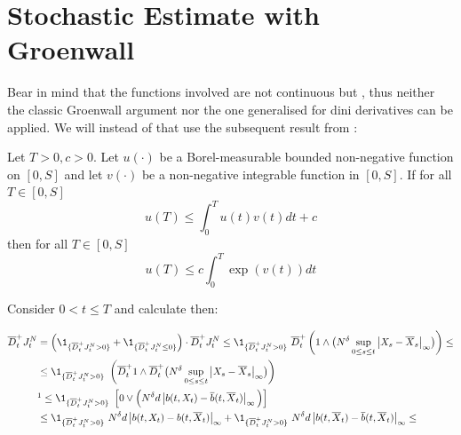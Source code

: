 \section{Stochastic Estimate with Groenwall}

Bear in mind that the functions involved are not continuous but \cadlag, thus neither the classic Groenwall argument nor the one generalised for dini derivatives \cite[Theorem 1.4.1]{groenwall-with-dini-derivatives} can be applied.
We will instead of that use the subsequent result from \cite[Chapter 1, Theorem 8.1]{groenwall-non-continuous-functions}:

\begin{lemma}	\label{ch6:lemma-groenwall-generalized}
	Let $T >0, c>0$. Let $u(\cdot)$ be a Borel-measurable bounded non-negative function on $[0,S]$ and let $v(\cdot)$ be a non-negative integrable function in $[0,S]$.
	If for all $T \in [0,S]$
		\begin{equation*}
			u(T) \leq \int_0^T u(t) v(t) dt + c
		\end{equation*}
	then for all $T \in [0,S]$
			\begin{equation*}
				u(T) \leq c\int_0^T \exp(v(t) )dt
			\end{equation*}
\end{lemma}

Consider $0 < t \leq T$ and calculate then:

\begin{align*}
	\diniu^+_t \auxProc_t^N 
	&= 
	\left( \1_{\{\diniu^+_t \auxProc_t^N >0 \}} + \1_{\{\diniu^+_t \auxProc_t^N \leq 0\}}\right) \cdot \diniu^+_t \auxProc_t^N 
	\leq
	 \1_{\{\diniu^+_t \auxProc_t^N >0 \}}\
	\diniu_t^+  
	\left(	
	1 \wedge \big( 
	N^{\cutparameter}
	\sup_{0 \leq s \leq t}
	\normp{\infty}{
		\sol_s - \mfsol_s
	} \big)
	\right)
	\leq
	\\
	&\leq
	\1_{\{\diniu^+_t \auxProc_t^N >0 \}}\
	\left(	
	\diniu_t^+ 1 \wedge \diniu_t^+ \big( 
	N^{\cutparameter}
	\sup_{0 \leq s \leq t}
	\normp{\infty}{
		\sol_s - \mfsol_s
	} \big)
	\right)
	\\
	&\footnotemark[1]\leq
	\1_{\{\diniu^+_t \auxProc_t^N >0 \}}\
	\left[
	0 \vee 
	\Big(
	N^{\cutparameter}d  
	\norm{\drift(t, \sol_t) - \mfdrift(t, \mfsol_t)}_\infty
	\Big)
	\right]	
	\\
	&\leq
	\1_{\{\diniu^+_t \auxProc_t^N >0 \}}\
	  N^{\cutparameter}d  \norm{\drift(t, \sol_t) - \drift(t, \mfsol_t)}_\infty 
	  +  
	  \1_{\{\diniu^+_t \auxProc_t^N >0 \}}\
	  N^{\cutparameter}d  \norm{\drift(t, \mfsol_t) - \mfdrift(t, \mfsol_t)}_\infty \leq
\end{align*}
\footnotetext[1]{by \ref{ch4:lemma:del-dini-of-all}}

